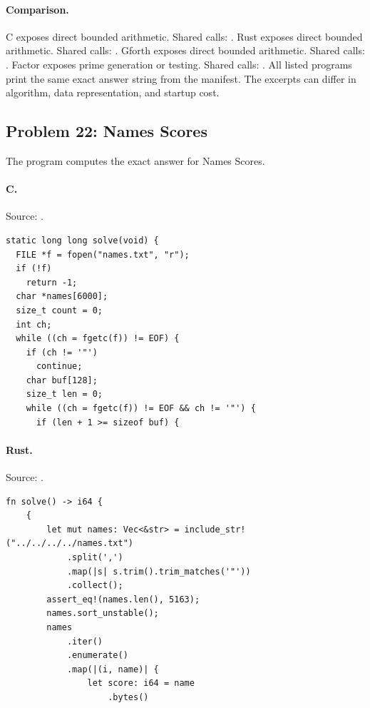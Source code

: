 \paragraph{Comparison.}
C exposes direct bounded arithmetic. Shared calls: \texttt{}. Rust exposes direct bounded arithmetic. Shared calls: \texttt{}. Gforth exposes direct bounded arithmetic. Shared calls: \texttt{}. Factor exposes prime generation or testing. Shared calls: \texttt{}.
All listed programs print the same exact answer string from the manifest. The excerpts can differ in algorithm, data representation, and startup cost.

\subsection{Problem 22: Names Scores}
\label{walkthrough:p22}
The program computes the exact answer for Names Scores.

\paragraph{C.} Source: .
\begin{lstlisting}
static long long solve(void) {
  FILE *f = fopen("names.txt", "r");
  if (!f)
    return -1;
  char *names[6000];
  size_t count = 0;
  int ch;
  while ((ch = fgetc(f)) != EOF) {
    if (ch != '"')
      continue;
    char buf[128];
    size_t len = 0;
    while ((ch = fgetc(f)) != EOF && ch != '"') {
      if (len + 1 >= sizeof buf) {
\end{lstlisting}

\paragraph{Rust.} Source: .
\begin{lstlisting}
fn solve() -> i64 {
    {
        let mut names: Vec<&str> = include_str!("../../../../names.txt")
            .split(',')
            .map(|s| s.trim().trim_matches('"'))
            .collect();
        assert_eq!(names.len(), 5163);
        names.sort_unstable();
        names
            .iter()
            .enumerate()
            .map(|(i, name)| {
                let score: i64 = name
                    .bytes()
\end{lstlisting}

